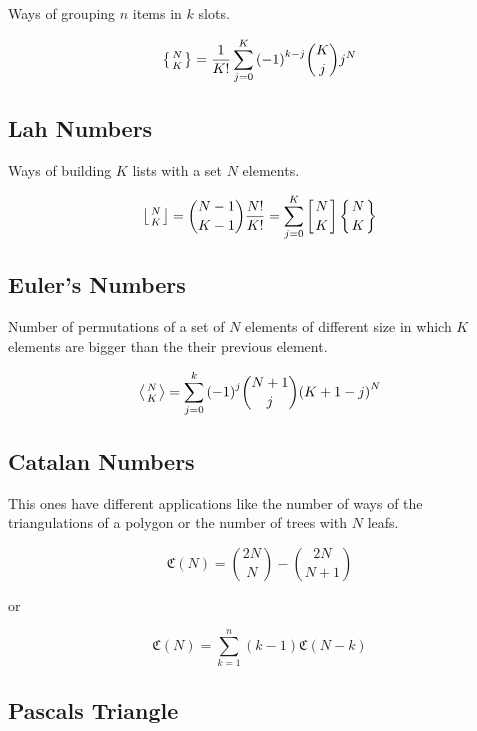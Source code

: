 Ways of grouping \(n\) items in \(k\) slots.

\[ \left\{ \begin{matrix} N \atop K \end{matrix}\right\} = \frac{1}{K!} \sum_{j=0}^{K}{(-1)}^{k - j}\binom{K}{j}j^N \]

\subsection{Lah Numbers}

Ways of building \(K\) lists with a set \(N\) elements.

\[\left\lfloor \begin{matrix} N \atop K \end{matrix}\right\rfloor  = \binom{N - 1}{K - 1}\frac{N!}{K!} = \sum_{j=0}^{K}\left[N \atop K\right]\left\{N \atop K\right\}\]

\subsection{Euler's Numbers}

Number of permutations of a set of \(N\) elements of different size in which
\(K\) elements are bigger than the their previous element.

\[\left\langle \begin{matrix} N \atop K \end{matrix}\right\rangle = \sum_{j = 0}^{k}{(-1)}^j \binom{N + 1}{j}{(K +1 -j)}^N\]

\subsection{Catalan Numbers}

This ones have different applications like the number of ways of the triangulations of
a polygon or the number of trees with \(N\) leafs.

\[\mathfrak{C}(N) = \binom{2N}{N} - \binom{2N}{N + 1}\]

or

\[\mathfrak{C}(N) = \sum_{k=1}^{n}(k - 1) \mathfrak{C}(N - k)\]

\subsection{Pascals Triangle}

